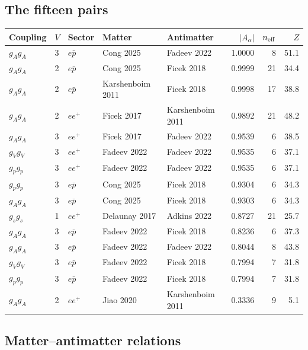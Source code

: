 \documentclass[11pt,a4paper]{article}
\newcommand{\Aa}{A_\alpha}
\begin{document}
\subsection{The fifteen pairs}

\begin{center}\small
\begin{tabular}{@{}lllllrrr@{}}
\toprule
Coupling & $V$ & Sector & Matter & Antimatter & $|\Aa|$ & $n_{\rm eff}$ & $Z$ \\
\midrule
$g_Ag_A$ & 3 & $e\bar p$ & Cong 2025 & Fadeev 2022 & 1.0000 & 8 & 51.1 \\
$g_Ag_A$ & 2 & $e\bar p$ & Cong 2025 & Ficek 2018 & 0.9999 & 21 & 34.4 \\
$g_Ag_A$ & 2 & $e\bar p$ & Karshenboim 2011 & Ficek 2018 & 0.9998 & 17 & 38.8 \\
$g_Ag_A$ & 2 & $ee^+$ & Ficek 2017 & Karshenboim 2011 & 0.9892 & 21 & 48.2 \\
$g_Ag_A$ & 3 & $ee^+$ & Ficek 2017 & Fadeev 2022 & 0.9539 & 6 & 38.5 \\
$g_Vg_V$ & 3 & $ee^+$ & Fadeev 2022 & Fadeev 2022 & 0.9535 & 6 & 37.1 \\
$g_pg_p$ & 3 & $ee^+$ & Fadeev 2022 & Fadeev 2022 & 0.9535 & 6 & 37.1 \\
$g_pg_p$ & 3 & $e\bar p$ & Cong 2025 & Ficek 2018 & 0.9304 & 6 & 34.3 \\
$g_Ag_A$ & 3 & $e\bar p$ & Cong 2025 & Ficek 2018 & 0.9303 & 6 & 34.3 \\
$g_sg_s$ & 1 & $ee^+$ & Delaunay 2017 & Adkins 2022 & 0.8727 & 21 & 25.7 \\
$g_Ag_A$ & 3 & $e\bar p$ & Fadeev 2022 & Ficek 2018 & 0.8236 & 6 & 37.3 \\
$g_Ag_A$ & 3 & $e\bar p$ & Fadeev 2022 & Fadeev 2022 & 0.8044 & 8 & 43.8 \\
$g_Vg_V$ & 3 & $e\bar p$ & Fadeev 2022 & Ficek 2018 & 0.7994 & 7 & 31.8 \\
$g_pg_p$ & 3 & $e\bar p$ & Fadeev 2022 & Ficek 2018 & 0.7994 & 7 & 31.8 \\
$g_Ag_A$ & 2 & $ee^+$ & Jiao 2020 & Karshenboim 2011 & 0.3336 & 9 & 5.1 \\
\bottomrule
\end{tabular}
\end{center}

\subsection{Matter--antimatter relations}
\end{document}
